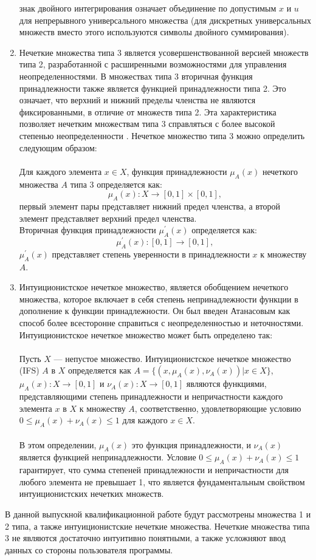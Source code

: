 \documentclass{article}
\begin{document}
\begin{enumerate}
        знак двойного интегрирования означает объединение по допустимым $x$ и $u$ для непрерывного универсального множества (для дискретных универсальных множеств вместо этого используются символы двойного суммирования).
        \item Нечеткие множества типа 3 является усовершенствованной версией множеств типа 2, разработанной с расширенными возможностями для управления неопределенностями. В множествах типа 3 вторичная функция принадлежности также является функцией принадлежности типа 2. Это означает, что верхний и нижний пределы членства не являются фиксированными, в отличие от множеств типа 2. Эта характеристика позволяет нечетким множествам типа 3 справляться с более высокой степенью неопределенности \cite{litlink22}. Нечеткое множество типа 3 можно определить следующим образом:\\
        ~\\
        Для каждого элемента \(x \in X\), функция принадлежности \(\mu_{A}(x)\) нечеткого множества \(A\) типа 3 определяется как:\\
        \[\mu_{A}(x) : X \rightarrow [0,1] \times [0,1],\]
        первый элемент пары представляет нижний предел членства, а второй элемент представляет верхний предел членства.\\
        Вторичная функция принадлежности \(\mu_{A}^{'}(x)\) определяется как:\\
        \[\mu_{A}^{'}(x) : [0,1] \rightarrow [0,1],\]
        \(\mu_{A}^{'}(x)\) представляет степень уверенности в принадлежности \(x\) к множеству \(A\).
        \item Интуиционистское нечеткое множество, является обобщением нечеткого множества, которое включает в себя степень непринадлежности функции в дополнение к функции принадлежности. Он был введен Атанасовым как способ более всесторонне справиться с неопределенностью и неточностями. Интуиционистское нечеткое множество может быть определено так:\\
        ~\\
        Пусть $X$ — непустое множество. Интуиционистское нечеткое множество (IFS) $A$ в $X$ определяется как $A = \{(x, \mu_A(x), \nu_A(x)) | x \in X\}$, $\mu_A(x): X \rightarrow [0,1]$ и $\nu_A(x): X \rightarrow [0,1]$ являются функциями, представляющими степень принадлежности и непричастности каждого элемента $x$ в $X$ к множеству $A$, соответственно, удовлетворяющие условию $0 \leq \mu_A(x) + \nu_A(x) \leq 1$ для каждого $x \in X$.\\
        ~\\
        В этом определении, $\mu_A(x)$ это функция принадлежности, и $\nu_A(x)$ является функцией непринадлежности. Условие $0 \leq \mu_A(x) + \nu_A(x) \leq 1$ гарантирует, что сумма степеней принадлежности и непричастности для любого элемента не превышает 1, что является фундаментальным свойством интуиционистских нечетких множеств.\\
    \end{enumerate}
    В данной выпускной квалификационной работе будут рассмотрены множества 1 и 2 типа, а также интуиционистские нечеткие множества. Нечеткие множества типа 3 не являются достаточно интуитивно понятными, а также усложняют ввод данных со стороны пользователя программы.
\end{document}
